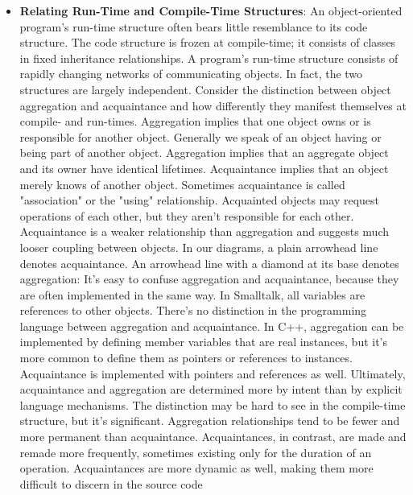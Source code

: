 \documentclass{report}
\begin{document}
\begin{itemize}
        \item \textbf{Relating Run-Time and Compile-Time Structures}: An object-oriented program's run-time structure often bears little resemblance to its code structure. The code structure is frozen at compile-time; it consists of classes in fixed inheritance relationships. A program's run-time structure consists of rapidly changing networks of communicating objects. In fact, the two structures are largely independent. 
            \bigbreak \noindent 
            Consider the distinction between object aggregation and acquaintance and how differently they manifest themselves at compile- and run-times. Aggregation implies that one object owns or is responsible for another object. Generally we speak of an object having or being part of another object. Aggregation implies that an aggregate object and its owner have identical lifetimes.
            \bigbreak \noindent 
            Acquaintance implies that an object merely knows of another object. Sometimes acquaintance is called "association" or the "using" relationship. Acquainted objects may request operations of each other, but they aren't responsible for each other. Acquaintance is a weaker relationship than aggregation and suggests much looser coupling between objects.
            \bigbreak \noindent 
            In our diagrams, a plain arrowhead line denotes acquaintance. An arrowhead line with a diamond at its base denotes aggregation:
            \bigbreak \noindent 
            \bigbreak \noindent 
            It's easy to confuse aggregation and acquaintance, because they are often implemented in the same way. In Smalltalk, all variables are references to other objects. There's no distinction in the programming language between aggregation and acquaintance. In C++, aggregation can be implemented by defining member variables that are real instances, but it's more common to define them as pointers or references to instances. Acquaintance is implemented with pointers and references as well.
            \bigbreak \noindent 
            Ultimately, acquaintance and aggregation are determined more by intent than by explicit language mechanisms. The distinction may be hard to see in the compile-time structure, but it's significant. Aggregation relationships tend to be fewer and more permanent than acquaintance. Acquaintances, in contrast, are made and remade more frequently, sometimes existing only for the duration of an operation. Acquaintances are more dynamic as well, making them more difficult to discern in the source code

\end{itemize}
\end{document}

